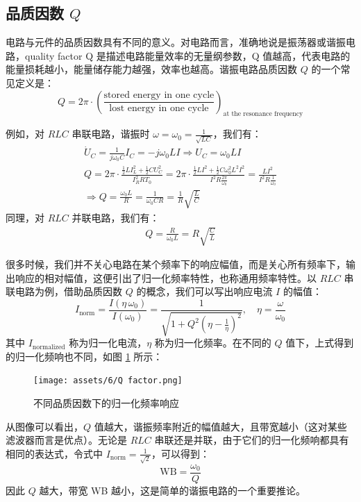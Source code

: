 \documentclass[UTF8]{report}
\theoremstyle{MyLineTheoremStyle} %
\theoremstyle{MyBlockTheoremStyle} %
\theoremstyle{MySubsubsectionStyle} %
\begin{document}
\subsection{品质因数 $Q$}
电路与元件的品质因数具有不同的意义。对电路而言，准确地说是振荡器或谐振电路，quality factor Q 是描述电路能量效率的无量纲参数，Q 值越高，代表电路的能量损耗越小，能量储存能力越强，效率也越高。谐振电路品质因数 $Q$ 的一个常见定义是：
\begin{equation}\label{品质因数定义}
Q = 2\pi \cdot \left(\frac{\text{stored energy in one cycle}}{\text{lost  energy in one cycle}}\right)_{\text{at the resonance frequency}}
\end{equation}

例如，对 $RLC$ 串联电路，谐振时 $\omega = \omega_0 = \frac{1}{\sqrt{LC}}$，我们有：
\begin{gather}
\dot{U}_C = \frac{1}{j \omega_0 C} I_C = - j \omega_0 L I \Longrightarrow  U_C = \omega_0 L I \\
Q = 2 \pi \cdot \frac{ \frac{1}{2}L I_L^2  + \frac{1}{2}C U_C^2}{I_R^2 R T_0} = 2 \pi \cdot \frac{\frac{1}{2}L I^2 + \frac{1}{2} C \omega_0^2 L^2 I^2  }{I^2 R \frac{2 \pi }{\omega_0}} = \frac{LI^2}{I^2R\frac{1}{\omega_0}}\\ 
\Longrightarrow Q = \frac{\omega_0 L}{R} = \frac{1}{\omega_0 CR} = \frac{1}{R}\sqrt{\frac{L}{C}}
\end{gather}
同理，对 $RLC$ 并联电路，我们有：
\begin{gather}
Q = \frac{R}{\omega_0 L} = R\sqrt{\frac{C}{L}}
\end{gather}


很多时候，我们并不关心电路在某个频率下的响应幅值，而是关心所有频率下，输出响应的相对幅值，这便引出了归一化频率特性，也称通用频率特性。以 $RLC$ 串联电路为例，借助品质因数 $Q$ 的概念，我们可以写出响应电流 $I$ 的幅值：
\begin{equation}
I_\text{norm} = \frac{I(\eta \, \omega_0)}{I(\omega_0)} = \frac{1}{\sqrt{ 1 + Q^2 \left(\eta - \frac{1}{\eta}\right)^2 }},\quad \eta = \frac{\omega}{\omega_0}
\end{equation}
其中 $I_\text{normalized}$ 称为归一化电流，$\eta$ 称为归一化频率。在不同的 $Q$ 值下，上式得到的归一化频响也不同，如图 \ref{不同品质因数下的归一化频率响应} 所示：
\begin{figure}[H]\centering
    \texttt{[image: assets/6/Q factor.png]}
    \caption{不同品质因数下的归一化频率响应}
    \label{不同品质因数下的归一化频率响应}
\end{figure}
从图像可以看出，$Q$ 值越大，谐振频率附近的幅值越大，且带宽越小（这对某些滤波器而言是优点）。无论是 $RLC$ 串联还是并联，由于它们的归一化频响都具有相同的表达式，令式中 $I_{\text{norm}} = \frac{1}{\sqrt{2}}$，可以得到：
\begin{equation}
\text{WB} = \frac{\omega_0}{Q} 
\end{equation}
因此 $Q$ 越大，带宽 WB 越小，这是简单的谐振电路的一个重要推论。
\end{document}
